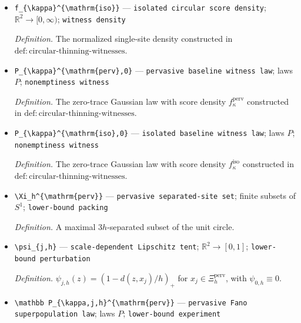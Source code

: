 \documentclass{article}
\begin{document}
\begin{itemize}
  \item \texttt{f\_\allowbreak{}\{\textbackslash{}\allowbreak{}kappa\}\allowbreak{}\textasciicircum{}\{\textbackslash{}\allowbreak{}mathrm\{iso\}\allowbreak{}\}\allowbreak{}} --- \texttt{isolated circular score density}; \(\mathbb R^2\to[0,\infty)\); \texttt{witness density}
  \par\smallskip\noindent\emph{Definition.} The normalized single-site density constructed in \(\mathrm{def:circular\text{-}thinning\text{-}witnesses}\).
  \item \texttt{P\_\allowbreak{}\{\textbackslash{}\allowbreak{}kappa\}\allowbreak{}\textasciicircum{}\{\textbackslash{}\allowbreak{}mathrm\{perv\}\allowbreak{},\allowbreak{}0\}\allowbreak{}} --- \texttt{pervasive baseline witness law}; laws \(P\); \texttt{nonemptiness witness}
  \par\smallskip\noindent\emph{Definition.} The zero-trace Gaussian law with score density \(f_{\kappa}^{\mathrm{perv}}\) constructed in \(\mathrm{def:circular\text{-}thinning\text{-}witnesses}\).
  \item \texttt{P\_\allowbreak{}\{\textbackslash{}\allowbreak{}kappa\}\allowbreak{}\textasciicircum{}\{\textbackslash{}\allowbreak{}mathrm\{iso\}\allowbreak{},\allowbreak{}0\}\allowbreak{}} --- \texttt{isolated baseline witness law}; laws \(P\); \texttt{nonemptiness witness}
  \par\smallskip\noindent\emph{Definition.} The zero-trace Gaussian law with score density \(f_{\kappa}^{\mathrm{iso}}\) constructed in \(\mathrm{def:circular\text{-}thinning\text{-}witnesses}\).
  \item \texttt{\textbackslash{}\allowbreak{}Xi\_\allowbreak{}h\textasciicircum{}\{\textbackslash{}\allowbreak{}mathrm\{perv\}\allowbreak{}\}\allowbreak{}} --- \texttt{pervasive separated-\allowbreak{}site set}; finite subsets of \(S^1\); \texttt{lower-\allowbreak{}bound packing}
  \par\smallskip\noindent\emph{Definition.} A maximal \(3h\)-separated subset of the unit circle.
  \item \texttt{\textbackslash{}\allowbreak{}psi\_\allowbreak{}\{j,\allowbreak{}h\}\allowbreak{}} --- \texttt{scale-\allowbreak{}dependent Lipschitz tent}; \(\mathbb R^2\to[0,1]\); \texttt{lower-\allowbreak{}bound perturbation}
  \par\smallskip\noindent\emph{Definition.} \(\psi_{j,h}(z)=(1-d(z,x_j)/h)_+\) for \(x_j\in\Xi_h^{\mathrm{perv}}\), with \(\psi_{0,h}\equiv0\).
  \item \texttt{\textbackslash{}\allowbreak{}mathbb P\_\allowbreak{}\{\textbackslash{}\allowbreak{}kappa,\allowbreak{}j,\allowbreak{}h\}\allowbreak{}\textasciicircum{}\{\textbackslash{}\allowbreak{}mathrm\{perv\}\allowbreak{}\}\allowbreak{}} --- \texttt{pervasive Fano superpopulation law}; laws \(P\); \texttt{lower-\allowbreak{}bound experiment}

\end{itemize}
\end{document}
